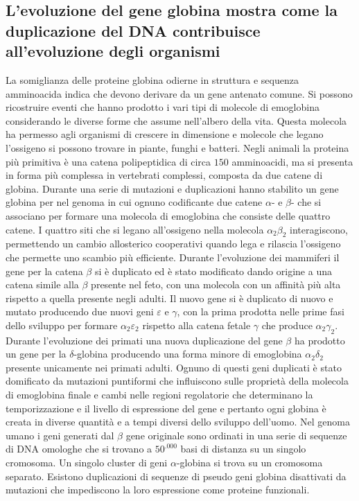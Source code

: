 \subsection{L'evoluzione del gene globina mostra come la duplicazione del DNA contribuisce all'evoluzione degli organismi}
La somiglianza delle proteine globina odierne in struttura e sequenza amminoacida indica che devono derivare da un gene antenato comune. Si possono ricostruire eventi che hanno prodotto
i vari tipi di molecole di emoglobina considerando le diverse forme che assume nell'albero della vita. Questa molecola ha permesso agli organismi di crescere in dimensione e molecole 
che legano l'ossigeno si possono trovare in piante, funghi e batteri. Negli animali la proteina pi\`u primitiva \`e una catena polipeptidica di circa $150$ amminoacidi, ma si presenta in
forma pi\`u complessa in vertebrati complessi, composta da due catene di globina. Durante una serie di mutazioni e duplicazioni hanno stabilito un gene globina per nel genoma in cui 
ognuno codificante due catene $\alpha$- e $\beta$- che si associano per formare una molecola di emoglobina che consiste delle quattro catene. I quattro siti che si legano all'ossigeno
nella molecola $\alpha_2\beta_2$ interagiscono, permettendo un cambio allosterico cooperativi quando lega e rilascia l'ossigeno che permette uno scambio pi\`u efficiente. Durante 
l'evoluzione dei mammiferi il gene per la catena $\beta$ si \`e duplicato ed \`e stato modificato dando origine a una catena simile alla $\beta$ presente nel feto, con una molecola con 
un affinit\`a pi\`u alta rispetto a quella presente negli adulti. Il nuovo gene si \`e duplicato di nuovo e mutato producendo due nuovi geni $\varepsilon$ e $\gamma$, con la prima 
prodotta nelle prime fasi dello sviluppo per formare $\alpha_2\varepsilon_2$ rispetto alla catena fetale $\gamma$ che produce $\alpha_2\gamma_2$. Durante l'evoluzione dei primati una 
nuova duplicazione del gene $\beta$ ha prodotto un gene per la $\delta$-globina producendo una forma minore di emoglobina $\alpha_2\delta_2$ presente unicamente nei primati adulti.
Ognuno di questi geni duplicati \`e stato domificato da mutazioni puntiformi che influiscono sulle propriet\`a della molecola di emoglobina finale e cambi nelle regioni regolatorie che
determinano la temporizzazione e il livello di espressione del gene e pertanto ogni globina \`e creata in diverse quantit\`a e a tempi diversi dello sviluppo dell'uomo. Nel genoma umano 
i geni generati dal $\beta$ gene originale sono ordinati in una serie di sequenze di DNA omologhe che si trovano a $50^.000$ basi di distanza su un singolo cromosoma. Un singolo cluster
di geni $\alpha$-globina si trova su un cromosoma separato. Esistono duplicazioni di sequenze di pseudo geni globina disattivati da mutazioni che impediscono la loro espressione come
proteine funzionali.
